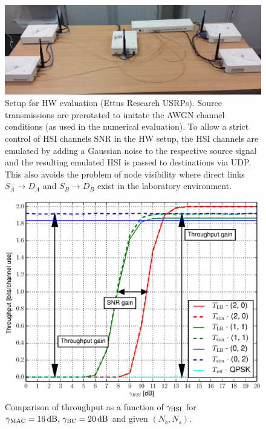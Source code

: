 \documentclass{article}
\begin{document}
\begin{figure}
\centering{}
\includegraphics[width=0.95\columnwidth]{fig/20150109_143009}
\caption{Setup for HW evaluation (Ettus Research
USRPs). Source transmissions are prerotated \cite{Koike-Popovski-Tarokh_2009a,Zhang-Liew_2010,Anxin-Yuan-Kayama_2008}
to imitate the AWGN channel conditions (as used in the numerical evaluation).
To allow a strict control of HSI channels SNR in the HW
setup, the HSI channels are emulated by adding a Gaussian noise to
the respective source signal and the resulting emulated HSI is passed
to destinations via UDP. This also avoids the problem of node visibility
where direct links $S_{A}\rightarrow D_{A}$ and $S_{B}\rightarrow D_{B}$
exist in the laboratory environment.\label{fig:CTUpp_HW_setup}}
\end{figure}


\begin{figure}
\begin{centering}
\hspace*{-0.04\columnwidth}
\includegraphics[width=0.95\columnwidth]{fig/Throughput_HSI_XOR_MAC16_BC20_N2}
\par\end{centering}

\caption{Comparison of throughput as a function of $\gamma_{{\rm {HSI}}}$
for $\gamma_{{\rm {MAC}}}=16\,\mathrm{dB},\,\gamma_{{\rm {BC}}}=20\,\mathrm{dB}$
and given $(N_{b},N_{s})$. \label{fig:CTUpp_Throughput16_20}}
\end{figure}
\end{document}
